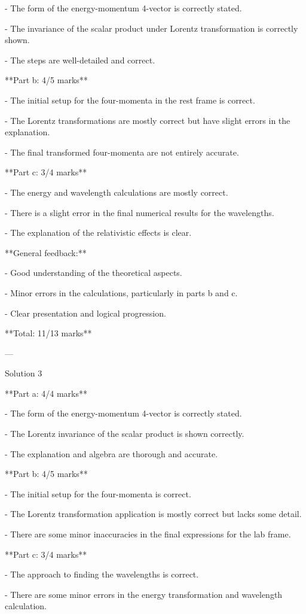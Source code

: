 \documentclass[a4paper,11pt]{article}
\begin{document}
- The form of the energy-momentum 4-vector is correctly stated.

- The invariance of the scalar product under Lorentz transformation is correctly shown.

- The steps are well-detailed and correct.

**Part b: 4/5 marks**

- The initial setup for the four-momenta in the rest frame is correct.

- The Lorentz transformations are mostly correct but have slight errors in the explanation.

- The final transformed four-momenta are not entirely accurate.

**Part c: 3/4 marks**

- The energy and wavelength calculations are mostly correct.

- There is a slight error in the final numerical results for the wavelengths.

- The explanation of the relativistic effects is clear.

**General feedback:**

- Good understanding of the theoretical aspects.

- Minor errors in the calculations, particularly in parts b and c.

- Clear presentation and logical progression.

**Total: 11/13 marks**

---

Solution 3

**Part a: 4/4 marks**

- The form of the energy-momentum 4-vector is correctly stated.

- The Lorentz invariance of the scalar product is shown correctly.

- The explanation and algebra are thorough and accurate.

**Part b: 4/5 marks**

- The initial setup for the four-momenta is correct.

- The Lorentz transformation application is mostly correct but lacks some detail.

- There are some minor inaccuracies in the final expressions for the lab frame.

**Part c: 3/4 marks**

- The approach to finding the wavelengths is correct.

- There are some minor errors in the energy transformation and wavelength calculation.
\end{document}
